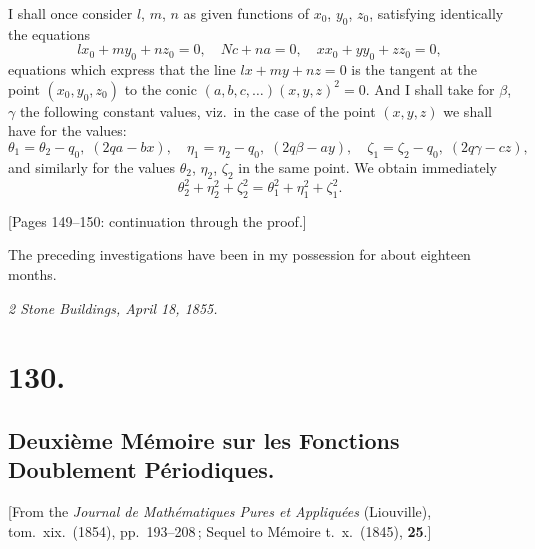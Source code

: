 \documentclass[11pt,a4paper]{article}
\theoremstyle{definition}
\begin{document}
I shall once consider $l$, $m$, $n$ as given functions of $x_0$, $y_0$, $z_0$, satisfying identically
the equations
\[
l x_0 + m y_0 + n z_0 = 0,\quad N c + n a = 0,\quad x x_0 + y y_0 + z z_0 = 0,
\]
equations which express that the line $lx + my + nz = 0$ is the tangent at the point $(x_0, y_0, z_0)$
to the conic $(a, b, c, \ldots)(x, y, z)^2 = 0$. And I shall take for $\beta$, $\gamma$ the following constant
values, viz.\ in the case of the point $(x, y, z)$ we shall have for the values:
\[
\theta_1=\theta_2-q_0,\;(2qa-bx),\quad\eta_1=\eta_2-q_0,\;(2q\beta-ay),\quad\zeta_1=\zeta_2 - q_0,\;(2q\gamma-cz),
\]
and similarly for the values $\theta_2$, $\eta_2$, $\zeta_2$ in the same point. We obtain immediately
\[
\theta_2^2 + \eta_2^2 + \zeta_2^2 = \theta_1^2 + \eta_1^2 + \zeta_1^2.
\]

\medskip

[Pages 149--150: continuation through the proof.]

\medskip

The preceding investigations have been in my possession for about eighteen months.

\medskip
\noindent\textit{2 Stone Buildings, April 18, 1855.}

\section*{130.}
\subsection*{Deuxi\`eme M\'emoire sur les Fonctions Doublement P\'eriodiques.}

[From the \textit{Journal de Math\'ematiques Pures et Appliqu\'ees} (Liouville), tom.\ xix.\ (1854),
pp.\ 193--208\,; Sequel to M\'emoire t.\ x.\ (1845), \textbf{25}.]

\medskip
\end{document}
